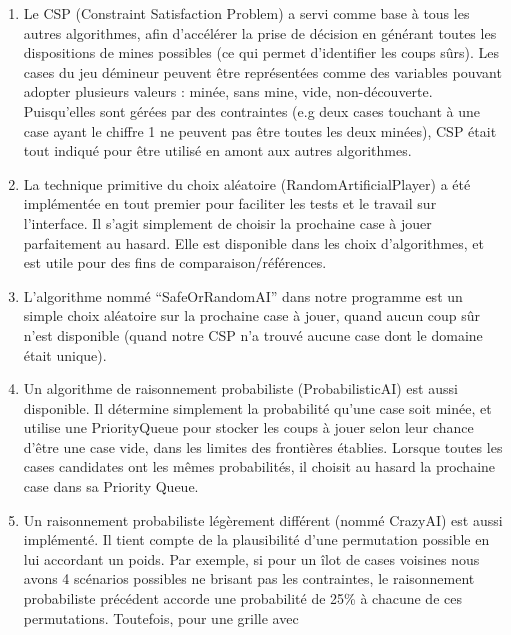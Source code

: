 \documentclass{article}
\begin{document}
\begin{enumerate}
        \item Le CSP (Constraint Satisfaction Problem) a servi comme base à tous 
              les autres algorithmes, afin d’accélérer la prise de décision en générant 
              toutes les dispositions de mines possibles (ce qui permet d’identifier les coups sûrs). 
              Les cases du jeu démineur peuvent être représentées comme des variables pouvant adopter 
              plusieurs valeurs : minée, sans mine, vide, non-découverte. Puisqu’elles sont gérées 
              par des contraintes (e.g deux cases touchant à une case ayant le chiffre 1 ne peuvent 
              pas être toutes les deux minées), CSP était tout indiqué pour être utilisé en amont aux autres algorithmes.
        \item La technique primitive du choix aléatoire (RandomArtificialPlayer) a été implémentée 
              en tout premier pour faciliter les tests et le travail sur l’interface. 
              Il s’agit simplement de choisir la prochaine case à jouer parfaitement au hasard. 
              Elle est disponible dans les choix d’algorithmes, et est utile pour des fins de comparaison/références.
        \item L’algorithme nommé “SafeOrRandomAI” dans notre programme est un simple choix 
              aléatoire sur la prochaine case à jouer, quand aucun coup sûr n’est disponible 
              (quand notre CSP n’a trouvé aucune case dont le domaine était unique).
        \item Un algorithme de raisonnement probabiliste (ProbabilisticAI) est aussi disponible. 
              Il détermine simplement la probabilité qu’une case soit minée, et utilise une 
              PriorityQueue pour stocker les coups à jouer selon leur chance d’être une 
              case vide, dans les limites des frontières établies. Lorsque toutes 
              les cases candidates ont les mêmes probabilités, il choisit au hasard la prochaine case dans sa Priority Queue.
        \item Un raisonnement probabiliste légèrement différent (nommé CrazyAI) est aussi implémenté. 
              Il tient compte de la plausibilité d’une permutation possible en lui accordant un poids. 
              Par exemple, si pour un îlot de cases voisines nous avons 4 scénarios possibles ne 
              brisant pas les contraintes, le raisonnement probabiliste précédent accorde une probabilité 
              de 25\% à chacune de ces permutations. Toutefois, pour une grille avec 

\end{enumerate}
\end{document}
